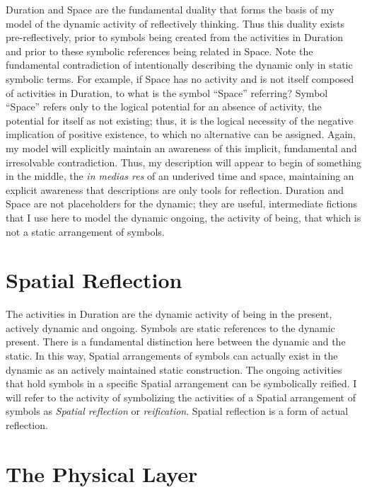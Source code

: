 Duration and Space are the fundamental duality that forms the basis of
my model of the dynamic activity of reflectively thinking.  Thus this
duality exists pre-reflectively, prior to symbols being created from
the activities in Duration and prior to these symbolic references
being related in Space.  Note the fundamental contradiction of
intentionally describing the dynamic only in static symbolic terms.
For example, if Space has no activity and is not itself composed of
activities in Duration, to what is the symbol ``Space'' referring?
Symbol ``Space'' refers only to the logical potential for an absence
of activity, the potential for itself as not existing; thus, it is the
logical necessity of the negative implication of positive existence,
to which no alternative can be assigned.  Again, my model will
explicitly maintain an awareness of this implicit, fundamental and
irresolvable contradiction.  Thus, my description will appear to begin
of something in the middle, the \emph{in medias res} of an underived
time and space, maintaining an explicit awareness that descriptions
are only tools for reflection.  Duration and Space are not
placeholders for the dynamic; they are useful, intermediate fictions
that I use here to model the dynamic ongoing, the activity of being,
that which is not a static arrangement of symbols.

\section{Spatial Reflection}

The activities in Duration are the dynamic activity of being in the
present, actively dynamic and ongoing.  Symbols are static references
to the dynamic present.  There is a fundamental distinction here
between the dynamic and the static.  In this way, Spatial arrangements
of symbols can actually exist in the dynamic as an actively maintained
static construction.  The ongoing activities that hold symbols in a
specific Spatial arrangement can be symbolically reified.  I will
refer to the activity of symbolizing the activities of a Spatial
arrangement of symbols as \emph{Spatial reflection} or
\emph{reification}.  Spatial reflection is a form of actual
reflection.

\section{The Physical Layer}

